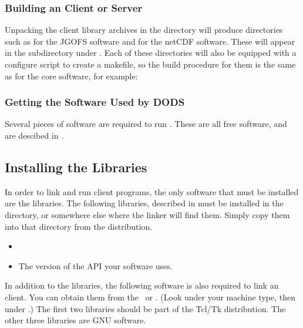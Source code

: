 \subsubsection{Building an \opendap Client or Server}

Unpacking the client library archives in the 
directory will produce directories such as  for the JGOFS
software and  for the netCDF software.  These will appear
in the  subdirectory under .  Each of these
directories will also be equipped with a configure script to create a
makefile, so the build procedure for them is the same as for the core
software, for example:


\subsubsection{Getting the Software Used by DODS}

Several pieces of software are required to run \opendap.  These are all
free software, and are descibed in .

\subsection{Installing the \opendap Libraries}
\label{install,lib-install}

In order to link and run client programs, the only \opendap software that
must be installed are the \opendap libraries. The following libraries,
described in  must be installed in the
 directory, or somewhere else where the linker will find
them. Simply copy them into that directory from the \opendap distribution.

\begin{itemize}

\item {}

\item The \opendap version of the API your software uses.

\end{itemize}

In addition to the \opendap libraries, the following software is also
required to link an \opendap client.  You can obtain them from the
\OPDhome\ or \OPDftp .  (Look under your machine
type, then under .)  The first two libraries
should be part of the Tcl/Tk distribution.  The other three libraries
are GNU software.

